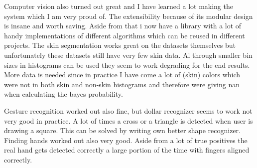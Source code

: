 \documentclass[11pt,a4paper]{article}
\begin{document}
Computer vision also turned out great and I have learned a lot making the system which I am very proud of. The extensibility because of its modular design is insane and worth saving. Aside from that i now have a library with a lot of handy implementations of different algorithms which can be reused in different projects. The skin segmentation works great on the datasets themselves but unfortunately these datasets still have very few skin data. Al through  smaller bin sizes in histograms can be used they seem to work degrading for the end results. More data is needed since in practice I have come a lot of (skin) colors which were not in both skin and non-skin histograms and therefore were giving nan when calculating the bayes probability.\bigskip

Gesture recognition worked out also fine, but dollar recognizer seems to work not very good in practice. A lot of times a cross or a triangle is detected when user is drawing a square. This can be solved by writing own better shape recognizer. Finding hands worked out also very good. Aside from a lot of true positives the real hand gets detected correctly a large portion of the time with fingers aligned correctly.



\end{document}
